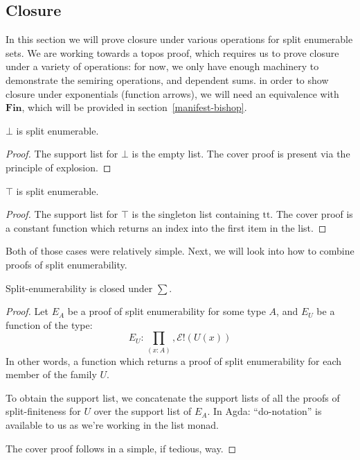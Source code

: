 \subsection{Closure}
In this section we will prove closure under various operations for split
enumerable sets.
We are working towards a topos proof, which requires us to prove closure under
a variety of operations: for now, we only have enough machinery to demonstrate
the semiring operations, and dependent sums.
in order to show closure under exponentials (function arrows), we will need an
equivalence with \(\mathbf{Fin}\), which will be provided in
section~\ref{manifest-bishop}.
\begin{lemma}
  \(\bot\) is split enumerable.
\end{lemma}
\begin{proof}
  The support list for \(\bot\) is the empty list.
  The cover proof is present via the principle of explosion.
\end{proof}
\begin{lemma}
  \(\top\) is split enumerable.
\end{lemma}
\begin{proof}
  The support list for \(\top\) is the singleton list containing \(\text{tt}\).
  The cover proof is a constant function which returns an index into the first
  item in the list.
\end{proof}
Both of those cases were relatively simple.
Next, we will look into how to combine proofs of split enumerability.
\begin{theorem}
  Split-enumerability is closed under \(\sum\).
\end{theorem}
\begin{proof}
  Let \(E_A\) be a proof of split enumerability for some type \(A\), and \(E_U\)
  be a function of the type:
  \begin{equation}
    E_U : \prod_{(x : A)} , \mathcal{E}!(U(x))
  \end{equation}
  In other words, a function which returns a proof of split enumerability for
  each member of the family \(U\).

  To obtain the support list, we concatenate the support lists of all the proofs
  of split-finiteness for \(U\) over the support list of \(E_A\).
  In Agda:
  ``do-notation'' is available to us as we're working in the list monad.

  The cover proof follows in a simple, if tedious, way.
\end{proof}
